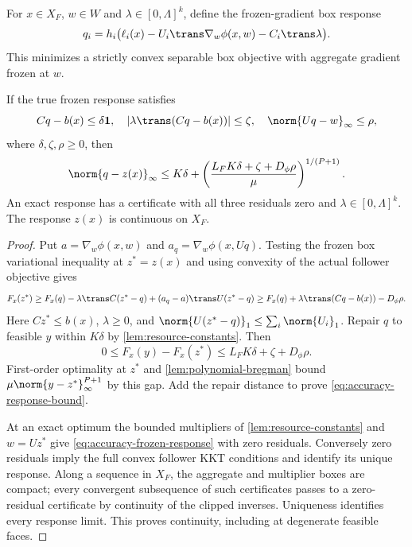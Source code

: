 For $x\in X_F$, $w\in W$ and $\lambda\in[0,\Lambda]^k$, define
the frozen-gradient box response
\begin{equation}\label{eq:accuracy-frozen-response}
 q_i=h_i\bigl(\ell_i(x)-U_i\trans\nabla_w\phi(x,w)
                                      -C_i\trans\lambda\bigr).
\end{equation}
This minimizes a strictly convex separable box objective with aggregate
gradient frozen at $w$.

\begin{lemma}\label{lem:accuracy-certificate}
If the true frozen response satisfies
\begin{equation}\label{eq:accuracy-residuals}
 Cq-b(x)\le\delta\mathbf1,\quad
 |\lambda\trans(Cq-b(x))|\le\zeta,\quad
                       \norm{Uq-w}_\infty\le\rho,
\end{equation}
where $\delta,\zeta,\rho\ge0$, then
\begin{equation}\label{eq:accuracy-response-bound}
 \norm{q-z(x)}_\infty
 \le K\delta+\left(\frac{L_FK\delta+\zeta+D_\phi\rho}{\mu}
                                                      \right)^{1/(P+1)}.
\end{equation}
An exact response has a certificate with all three residuals zero and
$\lambda\in[0,\Lambda]^k$. The response $z(x)$ is continuous on $X_F$.
\end{lemma}
\begin{proof}
Put $a=\nabla_w\phi(x,w)$ and $a_q=\nabla_w\phi(x,Uq)$.
Testing the frozen box variational inequality at $z^*=z(x)$ and
using convexity of the actual follower objective gives
\[
 F_x(z^*)\ge F_x(q)-\lambda\trans C(z^*-q)
                            +(a_q-a)\trans U(z^*-q)
 \ge F_x(q)+\lambda\trans(Cq-b(x))-D_\phi\rho.
\]
Here $Cz^*\le b(x)$, $\lambda\ge0$, and
$\norm{U(z^*-q)}_1\le\sum_i\norm{U_i}_1$. Repair $q$ to feasible
$y$ within $K\delta$ by \cref{lem:resource-constants}. Then
\[
 0\le F_x(y)-F_x(z^*)\le L_FK\delta+\zeta+D_\phi\rho.
\]
First-order optimality at $z^*$ and \cref{lem:polynomial-bregman}
bound $\mu\norm{y-z^*}_\infty^{P+1}$ by this gap. Add the repair
distance to prove \eqref{eq:accuracy-response-bound}.

At an exact optimum the bounded multipliers of
\cref{lem:resource-constants} and $w=Uz^*$ give
\eqref{eq:accuracy-frozen-response} with zero residuals. Conversely
zero residuals imply the full convex follower KKT conditions and identify
its unique response. Along a sequence in $X_F$, the aggregate and
multiplier boxes are compact; every convergent subsequence of such
certificates passes to a zero-residual certificate by continuity of
the clipped inverses. Uniqueness identifies every response limit.
This proves continuity, including at degenerate feasible faces.
\end{proof}

